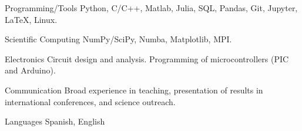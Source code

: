 

\begin{cvskills}

  \cvskill
    {Programming/Tools} %
    {Python, C/C++, Matlab, Julia, SQL, Pandas, Git, Jupyter, LaTeX, Linux.} %

  \cvskill
    {Scientific Computing} %
    {NumPy/SciPy, Numba, Matplotlib, MPI.} %

  \cvskill
    {Electronics} %
    {Circuit design and analysis. Programming of microcontrollers (PIC and Arduino).} %

  \cvskill
    {Communication} %
    {Broad experience in teaching, presentation of results in international conferences, and science outreach.} %

  \cvskill
    {Languages} %
    {Spanish, English} %

\end{cvskills}
